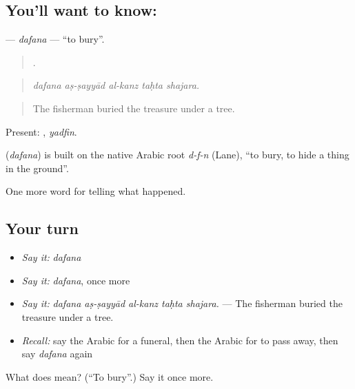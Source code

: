 \subsection*{You'll want to know: }
\textbf{} — \emph{dafana} — \textquotedblleft{}to bury\textquotedblright{}.

\begin{quote}
    .
\end{quote}

\begin{quote}
\emph{dafana aṣ-ṣayyād al-kanz taḥta shajara.}
\end{quote}

\begin{quote}
The fisherman buried the treasure under a tree.
\end{quote}

Present: , \emph{yadfin}.

\begin{cousinweb}
\textbf{} (\emph{dafana}) is built on the native Arabic root \emph{d-f-n} (Lane), \textquotedblleft{}to bury, to hide a thing in the ground\textquotedblright{}.
\end{cousinweb}

\begin{grammarlens}[title={What you've built}]
One more word for telling what happened.
\end{grammarlens}

\subsection*{Your turn}
\begin{itemize}
\raggedright
  \item \emph{Say it:} \emph{dafana}
  \item \emph{Say it:} \emph{dafana}, once more
  \item \emph{Say it:} \emph{dafana aṣ-ṣayyād al-kanz taḥta shajara.} — The fisherman buried the treasure under a tree.
  \item \emph{Recall:} say the Arabic for a funeral, then the Arabic for to pass away, then say \emph{dafana} again
\end{itemize}

\begin{tcolorbox}[breakable,colback=teal!4,colframe=teal!35!black,title={Before you move on}]
What does  mean? (\textquotedblleft{}To bury\textquotedblright{}.) Say it once more.
\end{tcolorbox}
